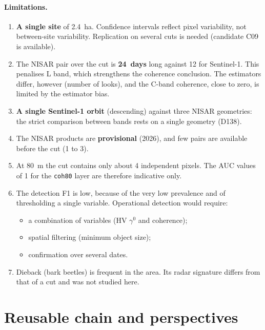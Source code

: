 \documentclass[11pt,a4paper]{article}
\begin{document}
\paragraph{Limitations.}
\begin{enumerate}
\item \textbf{A single site} of 2.4~ha. Confidence intervals reflect pixel variability, not between-site variability.
  Replication on several cuts is needed (candidate C09 is available).
\item The NISAR pair over the cut is \textbf{24~days} long against 12 for Sentinel-1. This penalises L band, which
  strengthens the coherence conclusion. The estimators differ, however (number of looks), and the C-band coherence,
  close to zero, is limited by the estimator bias.
\item \textbf{A single Sentinel-1 orbit} (descending) against three NISAR geometries: the strict comparison between
  bands rests on a single geometry (D138).
\item The NISAR products are \textbf{provisional} (2026), and few pairs are available before the cut (1 to 3).
\item At 80~m the cut contains only about 4 independent pixels. The AUC values of 1 for the \texttt{coh80} layer are
  therefore indicative only.
\item The detection F1 is low, because of the very low prevalence and of thresholding a single variable.
  Operational detection would require:
  \begin{itemize}
  \item a combination of variables (HV $\gamma^0$ and coherence);
  \item spatial filtering (minimum object size);
  \item confirmation over several dates.
  \end{itemize}
\item Dieback (bark beetles) is frequent in the area. Its radar signature differs from that of a cut and was not
  studied here.
\end{enumerate}

\section{Reusable chain and perspectives}
\end{document}
